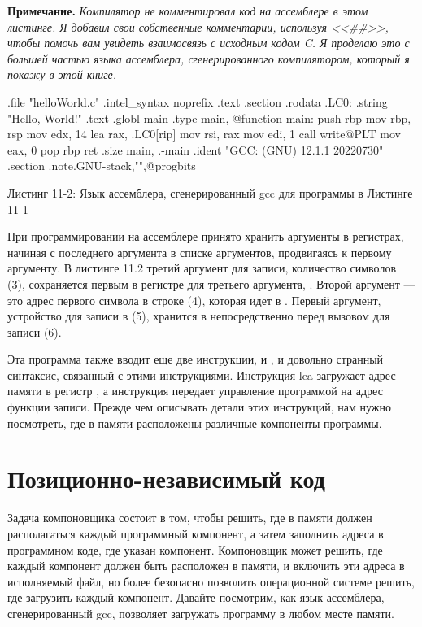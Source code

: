 \textbf{Примечание.}
\textit{Компилятор не комментировал код на ассемблере в этом листинге. Я добавил свои собственные комментарии, используя <<\#\#>>, чтобы помочь вам увидеть взаимосвязь с исходным кодом C. Я проделаю это с большей частью языка ассемблера, сгенерированного компилятором, который я покажу в этой книге.}

\begin{ffcode}
	.file	"helloWorld.c"
	.intel_syntax noprefix
	.text
	.section	.rodata
.LC0:
	.string	"Hello, World!\n"
	.text
	.globl	main
	.type	main, @function
main:
	push	rbp
	mov	rbp, rsp
	mov	edx, 14
	lea	rax, .LC0[rip]
	mov	rsi, rax
	mov	edi, 1
	call	write@PLT
	mov	eax, 0
	pop	rbp
	ret
	.size	main, .-main
	.ident	"GCC: (GNU) 12.1.1 20220730"
	.section	.note.GNU-stack,"",@progbits
\end{ffcode}

Листинг 11-2: Язык ассемблера, сгенерированный gcc для программы в Листинге 11-1

При программировании на ассемблере принято хранить аргументы в регистрах, начиная с последнего аргумента в списке аргументов, продвигаясь к первому аргументу. В листинге 11.2 третий аргумент для записи, количество символов (3), сохраняется первым в регистре для третьего аргумента, . Второй аргумент — это адрес первого символа в строке (4), которая идет в . Первый аргумент, устройство для записи в (5), хранится в  непосредственно перед вызовом для записи (6).

Эта программа также вводит еще две инструкции,  и , и довольно странный синтаксис, связанный с этими инструкциями. Инструкция lea загружает адрес памяти  в регистр , а инструкция  передает управление программой на адрес функции записи. Прежде чем описывать детали этих инструкций, нам нужно посмотреть, где в памяти расположены различные компоненты программы.

\section{Позиционно-независимый код}

Задача компоновщика состоит в том, чтобы решить, где в памяти должен располагаться каждый программный компонент, а затем заполнить адреса в программном коде, где указан компонент. Компоновщик может решить, где каждый компонент должен быть расположен в памяти, и включить эти адреса в исполняемый файл, но более безопасно позволить операционной системе решить, где загрузить каждый компонент. Давайте посмотрим, как язык ассемблера, сгенерированный gcc, позволяет загружать программу в любом месте памяти.

